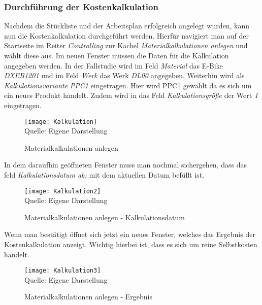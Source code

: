 \subsubsection{Durchführung der Kostenkalkulation}
Nachdem die Stückliste und der Arbeitsplan erfolgreich angelegt wurden, kann nun die Kostenkalkulation durchgeführt werden. Hierfür navigiert man auf der Startseite im Reiter \textit{Controlling} zur Kachel \textit{Materialkalkulationen anlegen} und wählt diese aus.
 Im neuen Fenster müssen die Daten für die Kalkulation angegeben werden. In der Fallstudie wird im Feld \textit{Material} das E-Bike \textit{DXEB1201} und im Feld \textit{Werk} das Werk \textit{DL00} angegeben. Weiterhin wird als \textit{Kalkulationsvariante} \textit{PPC1} eingetragen. Hier wird PPC1 gewählt da es sich um ein neues Produkt handelt. Zudem wird in das Feld 
 \textit{Kalkulationsgröße} der Wert \textit{1} eingetragen.

\begin{figure}[H]
    \caption{Materialkalkulationen anlegen}\label{fig:kalkulation}
    \texttt{[image: Kalkulation]}
    \\
    Quelle: Eigene Darstellung
\end{figure}

In dem daraufhin geöffneten Fenster muss man nochmal sichergehen, dass das feld \textit{Kalkulationsdatum ab:} mit dem aktuellen Datum befüllt ist.

\begin{figure}[H]
    \caption{Materialkalkulationen anlegen - Kalkulationsdatum}\label{fig:kalkulation2}
    \texttt{[image: Kalkulation2]}
    \\
    Quelle: Eigene Darstellung
\end{figure}

Wenn man bestätigt öffnet sich jetzt ein neues Fenster, welches das Ergebnis der Kostenkalkulation anzeigt. Wichtig hierbei ist, dass es sich um reine Selbstkosten handelt. 

\begin{figure}[H]
    \caption{Materialkalkulationen anlegen - Ergebnis}\label{fig:kalkulation3}
    \texttt{[image: Kalkulation3]}
    \\
    Quelle: Eigene Darstellung
\end{figure}

